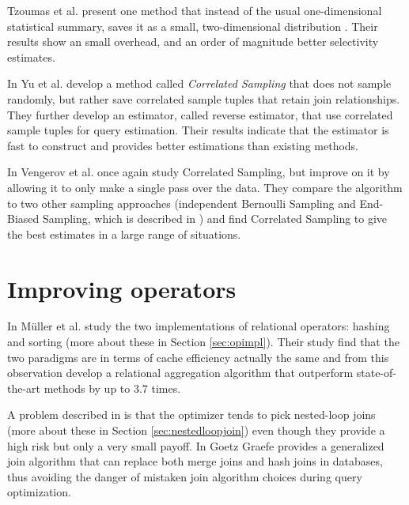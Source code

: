 Tzoumas et al. present one method that instead of the usual one-dimensional statistical summary, saves it as a small, two-dimensional distribution \cite{tzoumas_2011_lightweight_lgmfsewia}. Their results show an small overhead, and an order of magnitude better selectivity estimates.

In \cite{yu_2013_cs2_candsfqea} Yu et al. develop a  method called \textit{Correlated Sampling} that does not sample randomly, but rather save correlated sample tuples that retain join relationships. They further develop an estimator, called reverse estimator, that use correlated sample tuples for query estimation. Their results indicate that the estimator is fast to construct and provides better estimations than existing methods.

In \cite{vengerov_2015_join_jsestfc} Vengerov et al. once again study Correlated Sampling, but improve on it by allowing it to only make a single pass over the data. They compare the algorithm to two other sampling approaches (independent Bernoulli Sampling and End-Biased Sampling, which is described in \cite{estan_2006_end_esfjce}) and find Correlated Sampling to give the best estimates in a large range of situations.

\section{Improving operators}
In \cite{muller_2015_cache_cahis} Müller et al. study the two implementations of relational operators: hashing and sorting (more about these in Section \ref{sec:opimpl}). Their study find that the two paradigms are in terms of cache efficiency actually the same and from this observation develop a relational aggregation algorithm that outperform state-of-the-art methods by up to 3.7 times.

A problem described in \cite{leis_2015_how_hgaqor} is that the optimizer tends to pick nested-loop joins (more about these in Section \ref{sec:nestedloopjoin}) even though they provide a high risk but only a very small payoff. In \cite{graefe_2011_generalized_agja} Goetz Graefe provides a generalized join algorithm that can replace both merge joins and hash joins in databases, thus avoiding the danger of mistaken join algorithm choices during query optimization.